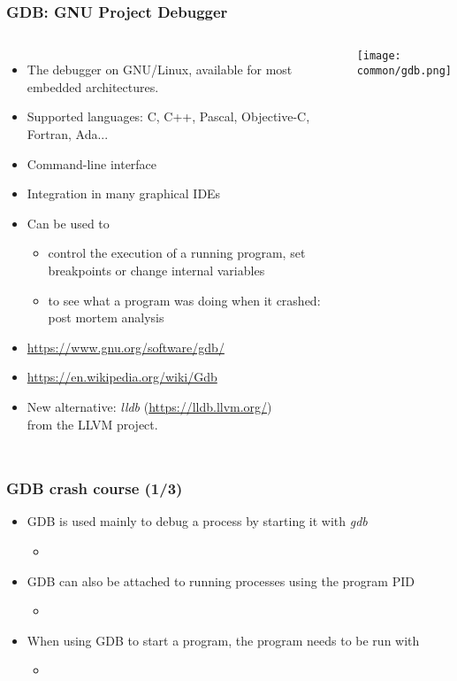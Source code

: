 \begin{frame}
  \frametitle{GDB: GNU Project Debugger}
  \fontsize{11}{11}\selectfont
  \begin{columns}[T]
    \begin{itemize}
    \item The debugger on GNU/Linux, available for most embedded
      architectures.
    \item Supported languages: C, C++, Pascal, Objective-C, Fortran,
      Ada...
    \item Command-line interface
    \item Integration in many graphical IDEs
    \item Can be used to
      \begin{itemize}
      \item control the execution of a running program, set
        breakpoints or change internal variables
      \item to see what a program was doing when it crashed: post
        mortem analysis
      \end{itemize}
    \item \url{https://www.gnu.org/software/gdb/}
    \item \url{https://en.wikipedia.org/wiki/Gdb}
    \item New alternative: {\em lldb} (\url{https://lldb.llvm.org/})\\
      from the LLVM project.
    \end{itemize}
    \texttt{[image: common/gdb.png]}
  \end{columns}
\end{frame}

\begin{frame}[fragile]
  \frametitle{GDB crash course (1/3)}
  \begin{itemize}
    \item GDB is used mainly to debug a process by starting it with {\em gdb}
    \begin{itemize}
      \item {}
    \end{itemize}
    \item GDB can also be attached to running processes using the program PID
    \begin{itemize}
      \item {}
    \end{itemize}
    \item When using GDB to start a program, the program needs to be run with
    \begin{itemize}
      \item {}
    \end{itemize}
  \end{itemize}
\end{frame}

